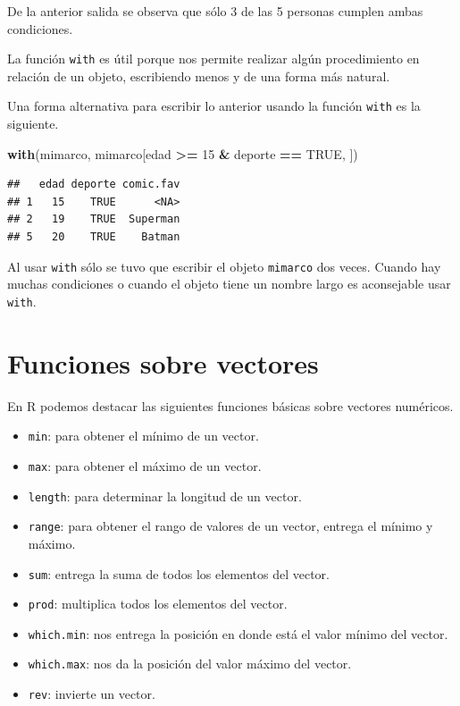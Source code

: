 \documentclass[10pt,]{krantz}
\makeatletter
\newenvironment{Shaded}{\begin{snugshade}}{\end{snugshade}}
\newcommand{\KeywordTok}[1]{\textcolor[rgb]{0.13,0.29,0.53}{\textbf{#1}}}
\newcommand{\DecValTok}[1]{\textcolor[rgb]{0.00,0.00,0.81}{#1}}
\newcommand{\StringTok}[1]{\textcolor[rgb]{0.31,0.60,0.02}{#1}}
\newcommand{\OtherTok}[1]{\textcolor[rgb]{0.56,0.35,0.01}{#1}}
\newcommand{\OperatorTok}[1]{\textcolor[rgb]{0.81,0.36,0.00}{\textbf{#1}}}
\newcommand{\NormalTok}[1]{#1}
\providecommand{\tightlist}{%
  \setlength{\itemsep}{0pt}\setlength{\parskip}{0pt}}
\newenvironment{kframe}{%
\medskip{}
\setlength{\fboxsep}{.8em}
 \def\at@end@of@kframe{}%
 \ifinner\ifhmode%
  \def\at@end@of@kframe{\end{minipage}}%
  \begin{minipage}{\columnwidth}%
 \fi\fi%
 \def\FrameCommand##1{\hskip\@totalleftmargin \hskip-\fboxsep
 \colorbox{shadecolor}{##1}\hskip-\fboxsep
     \hskip-\linewidth \hskip-\@totalleftmargin \hskip\columnwidth}%
 \MakeFramed {\advance\hsize-\width
   \@totalleftmargin\z@ \linewidth\hsize
   \@setminipage}}%
 {\par\unskip\endMakeFramed%
 \at@end@of@kframe}
\renewenvironment{Shaded}{\begin{kframe}}{\end{kframe}}
\let\BeginKnitrBlock\begin \let\EndKnitrBlock\end
\makeatother
\begin{document}
De la anterior salida se observa que sólo 3 de las 5 personas cumplen
ambas condiciones.

 \BeginKnitrBlock{rmdtip}

La función \texttt{with} es útil porque nos permite realizar algún
procedimiento en relación de un objeto, escribiendo menos y de una forma
más natural.
\EndKnitrBlock{rmdtip}

Una forma alternativa para escribir lo anterior usando la función
\texttt{with} es la siguiente.

\begin{Shaded}
\begin{Highlighting}[]
\KeywordTok{with}\NormalTok{(mimarco, mimarco[edad }\OperatorTok{>=}\StringTok{ }\DecValTok{15} \OperatorTok{&}\StringTok{ }\NormalTok{deporte }\OperatorTok{==}\StringTok{ }\OtherTok{TRUE}\NormalTok{, ])}
\end{Highlighting}
\end{Shaded}

\begin{verbatim}
##   edad deporte comic.fav
## 1   15    TRUE      <NA>
## 2   19    TRUE  Superman
## 5   20    TRUE    Batman
\end{verbatim}

Al usar \texttt{with} sólo se tuvo que escribir el objeto
\texttt{mimarco} dos veces. Cuando hay muchas condiciones o cuando el
objeto tiene un nombre largo es aconsejable usar \texttt{with}.

\section{Funciones sobre vectores}\label{funciones-sobre-vectores}

En R podemos destacar las siguientes funciones básicas sobre vectores
numéricos.

    
  

\begin{itemize}
\tightlist
\item
  \texttt{min}: para obtener el mínimo de un vector.
\item
  \texttt{max}: para obtener el máximo de un vector.
\item
  \texttt{length}: para determinar la longitud de un vector.
\item
  \texttt{range}: para obtener el rango de valores de un vector, entrega
  el mínimo y máximo.
\item
  \texttt{sum}: entrega la suma de todos los elementos del vector.
\item
  \texttt{prod}: multiplica todos los elementos del vector.
\item
  \texttt{which.min}: nos entrega la posición en donde está el valor
  mínimo del vector.
\item
  \texttt{which.max}: nos da la posición del valor máximo del vector.
\item
  \texttt{rev}: invierte un vector.
\end{itemize}
\end{document}
